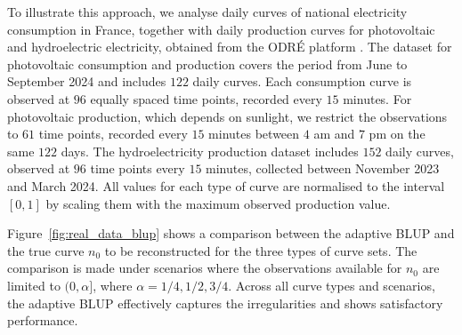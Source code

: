 To illustrate this approach, we analyse daily curves of national electricity consumption in France, together with daily production curves for photovoltaic and hydroelectric electricity, obtained from the ODRÉ platform \citep{odre_data}. The dataset for photovoltaic consumption and production covers the period from June to September 2024 and includes $122$ daily curves. Each consumption curve is observed at $96$ equally spaced time points, recorded every $15$ minutes. For photovoltaic production, which depends on sunlight, we restrict the observations to $61$ time points, recorded every $15$ minutes between $4$ am and $7$ pm on the same $122$ days. The hydroelectricity production dataset includes $152$ daily curves, observed at $96$ time points every $15$ minutes, collected between November 2023 and March 2024. All values for each type of curve are normalised to the interval $[0,1]$ by scaling them with the maximum observed production value.

Figure~\ref{fig:real_data_blup} shows a comparison between the adaptive BLUP and the true curve $n_0$ to be reconstructed for the three types of curve sets. The comparison is made under scenarios where the observations available for $n_0$ are limited to $(0, \alpha]$, where $\alpha = 1/4, 1/2, 3/4$. Across all curve types and scenarios, the adaptive BLUP effectively captures the irregularities and shows satisfactory performance. 


